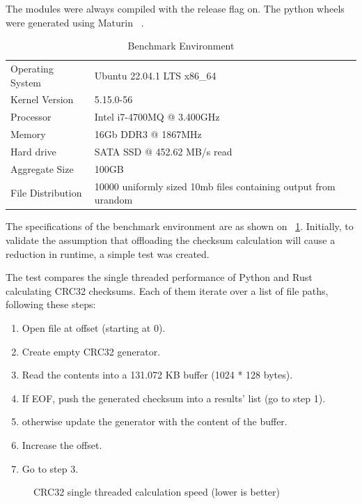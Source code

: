 The modules were always compiled with the release flag on.
The python wheels were generated using Maturin ~\cite{Maturin}.

\begin{table}[]
\begin{tabular}{ll}
Operating System  & Ubuntu 22.04.1 LTS x86\_64                                     \\
Kernel Version    & 5.15.0-56                                                      \\
Processor         & Intel i7-4700MQ @ 3.400GHz                                     \\
Memory            & 16Gb DDR3 @ 1867MHz                                             \\
Hard drive        & SATA SSD @ 452.62 MB/s read                                    \\
Aggregate Size    & 100GB                                                           \\
File Distribution & 10000 uniformly sized 10mb files containing output from urandom
\end{tabular}
\caption{Benchmark Environment}
\label{tab:checksum_tab_1}
\end{table}

The specifications of the benchmark environment are as shown on ~\ref{tab:checksum_tab_1}.
Initially, to validate the assumption that offloading the checksum calculation will cause a reduction
in runtime, a simple test was created.

The test compares the single threaded performance of Python and Rust calculating CRC32 checksums.
Each of them iterate over a list of file paths, following these steps:
\begin{enumerate}
    \item Open file at offset (starting at 0).
    \item Create empty CRC32 generator.
    \item Read the contents into a 131.072 KB buffer (1024 * 128 bytes).
    \item If EOF, push the generated checksum into a results' list (go to step 1).
    \item otherwise update the generator with the content of the buffer.
    \item Increase the offset.
    \item Go to step 3.
\end{enumerate}

\begin{figure}[H]
    \centering
    \begin{bchart}[step=50,max=350, unit=s]
        \medskip
    \end{bchart}
    \caption{CRC32 single threaded calculation speed (lower is better)}
    \label{fig:checksum_fig_2}
\end{figure}


